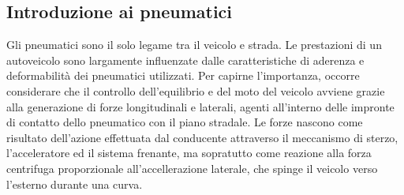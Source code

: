 \subsection{Introduzione ai pneumatici}
Gli pneumatici sono il solo legame tra il veicolo e strada. Le prestazioni di un autoveicolo sono largamente influenzate dalle caratteristiche di aderenza e deformabilità dei pneumatici utilizzati.
Per capirne l’importanza, occorre considerare che il controllo dell’equilibrio e del moto del veicolo avviene grazie alla generazione di forze longitudinali e laterali, agenti all’interno delle impronte di contatto dello pneumatico con il piano stradale. Le forze nascono come risultato dell’azione effettuata dal conducente attraverso il meccanismo di sterzo, l’acceleratore ed il sistema frenante, ma sopratutto come reazione alla forza centrifuga proporzionale all'accellerazione laterale, che spinge il veicolo verso l'esterno durante una curva.


